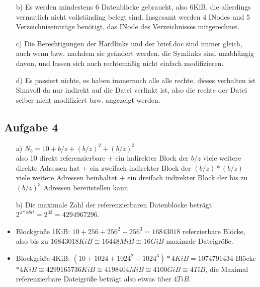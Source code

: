 \documentclass{scrartcl}
\begin{document}
\begin{itemize}

\item[b)]
Es werden mindestens 6 Datenblöcke gebraucht, also 6KiB, die allerdings vermutlich nicht vollständing belegt sind.
Insgesamt werden 4 INodes und 5 Verzeichniseinträge benötigt, das INode des Verzeichnisses mitgerechnet.


\item[c)]
Die Berechtigungen der Hardlinks und der brief.doc sind immer gleich, auch wenn bzw. nachdem sie 
geändert werden. die Symlinks sind unabhängig davon, und lassen sich auch rechtemäßig nicht
einfach modifizieren.

\item[d)]
Es passiert nichts, es haben immernoch alle alle rechte, dieses verhalten ist Sinnvoll da nur indirekt auf die Datei
verlinkt ist, also die rechte der Datei selber nicht modifiziert bzw. angezeigt werden.

\end{itemize}

\subsection*{Aufgabe 4}
\begin{itemize}
\item[a)] $N_b = 10 + b / z + (b / z)^2 + (b / z)^3 $ \\
    also 10 direkt referenzierbare + ein indirekter Block der $b/z$ viele weitere direkte Adressen hat + ein 
    zweifach indirekter Block der $(b/z)*(b/z)$ viele weitere Adressen beinhaltet + ein dreifach indirekter
    Block der bis zu $(b/z)^3$ Adressen bereitstellen kann.

\item[b)] Die maximale Zahl der referenzierbaren Datenblöcke beträgt
    $2^{4*8bit} = 2^{32} = 4294967296$.
    \item Blockgröße 1KiB: $10 + 256 + 256^2 + 256^3 = 16843018$ referzierbare Blöcke, also
    bis zu $16843018KiB \cong 16448MiB \cong 16GiB$ maximale Dateigröße.
    \item Blockgröße 4KiB: $(10 + 1024 + 1024^2 + 1024^3) * 4KiB = 1074791434$ Blöcke $* 4KiB \cong
    4299165736KiB \cong 4198404MiB \cong 4100GiB \cong 4TiB$, die Maximal referenzierbare
    Dateigröße beträgt also etwas über $4TiB$.

\end{itemize}
\end{document}
